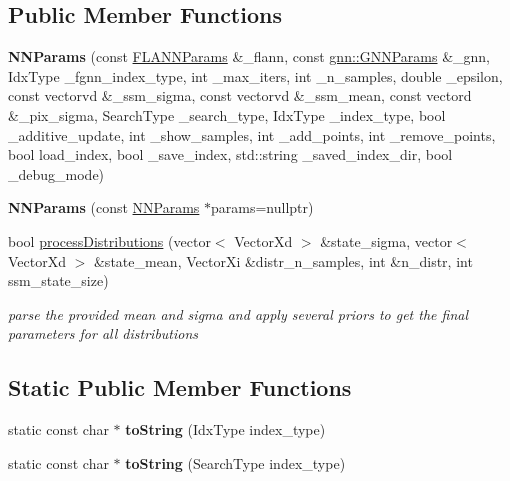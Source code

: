 \subsection*{Public Member Functions}
\begin{DoxyCompactItemize}
\item 
\hypertarget{structmtf_1_1NNParams_aa31fd829c1dd1aa7977bea3e2a4db638}{{\bfseries N\-N\-Params} (const \hyperlink{structmtf_1_1FLANNParams}{F\-L\-A\-N\-N\-Params} \&\-\_\-flann, const \hyperlink{structgnn_1_1GNNParams}{gnn\-::\-G\-N\-N\-Params} \&\-\_\-gnn, Idx\-Type \-\_\-fgnn\-\_\-index\-\_\-type, int \-\_\-max\-\_\-iters, int \-\_\-n\-\_\-samples, double \-\_\-epsilon, const vectorvd \&\-\_\-ssm\-\_\-sigma, const vectorvd \&\-\_\-ssm\-\_\-mean, const vectord \&\-\_\-pix\-\_\-sigma, Search\-Type \-\_\-search\-\_\-type, Idx\-Type \-\_\-index\-\_\-type, bool \-\_\-additive\-\_\-update, int \-\_\-show\-\_\-samples, int \-\_\-add\-\_\-points, int \-\_\-remove\-\_\-points, bool load\-\_\-index, bool \-\_\-save\-\_\-index, std\-::string \-\_\-saved\-\_\-index\-\_\-dir, bool \-\_\-debug\-\_\-mode)}\label{structmtf_1_1NNParams_aa31fd829c1dd1aa7977bea3e2a4db638}

\item 
\hypertarget{structmtf_1_1NNParams_af8cfa59e545aa5733053d8cc59574bf7}{{\bfseries N\-N\-Params} (const \hyperlink{structmtf_1_1NNParams}{N\-N\-Params} $\ast$params=nullptr)}\label{structmtf_1_1NNParams_af8cfa59e545aa5733053d8cc59574bf7}

\item 
\hypertarget{structmtf_1_1NNParams_acfd3184821a45e10e5907b691b1c793c}{bool \hyperlink{structmtf_1_1NNParams_acfd3184821a45e10e5907b691b1c793c}{process\-Distributions} (vector$<$ Vector\-Xd $>$ \&state\-\_\-sigma, vector$<$ Vector\-Xd $>$ \&state\-\_\-mean, Vector\-Xi \&distr\-\_\-n\-\_\-samples, int \&n\-\_\-distr, int ssm\-\_\-state\-\_\-size)}\label{structmtf_1_1NNParams_acfd3184821a45e10e5907b691b1c793c}

\begin{DoxyCompactList}\small\item\em parse the provided mean and sigma and apply several priors to get the final parameters for all distributions \end{DoxyCompactList}\end{DoxyCompactItemize}
\subsection*{Static Public Member Functions}
\begin{DoxyCompactItemize}
\item 
\hypertarget{structmtf_1_1NNParams_a45a110f61debe02ca06169e324c78700}{static const char $\ast$ {\bfseries to\-String} (Idx\-Type index\-\_\-type)}\label{structmtf_1_1NNParams_a45a110f61debe02ca06169e324c78700}

\item 
\hypertarget{structmtf_1_1NNParams_a147b03b359ee6c9ea2d172bedccf1573}{static const char $\ast$ {\bfseries to\-String} (Search\-Type index\-\_\-type)}\label{structmtf_1_1NNParams_a147b03b359ee6c9ea2d172bedccf1573}

\end{DoxyCompactItemize}
